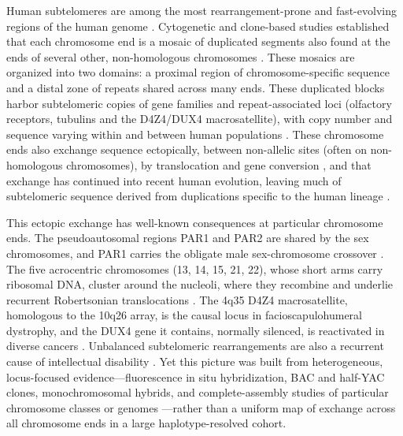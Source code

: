 \documentclass[pdflatex,mathphys]{jnl}
\begin{document}
\maketitle

Human subtelomeres are among the most rearrangement-prone and fast-evolving
regions of the human genome \cite{MeffordTrask2002}. Cytogenetic and clone-based studies established that each chromosome end is a mosaic of duplicated segments also found at the ends of several other, non-homologous chromosomes \cite{Flint1997,Linardopoulou2005}. These mosaics are organized into two domains: a proximal region of chromosome-specific sequence and a distal zone of repeats shared across many ends.
These duplicated blocks harbor subtelomeric copies of gene families and
repeat-associated loci (olfactory receptors, tubulins and the D4Z4/DUX4
macrosatellite), with copy number and sequence varying within and between human
populations
\cite{MeffordTrask2002,segdup_bailey_eichler2006,segdup_jeong_yoo2025}.
These chromosome ends also exchange sequence ectopically, between non-allelic sites (often on non-homologous chromosomes), by translocation and gene conversion \cite{Brown1990,Wilkie1991,Trask1991}, and that exchange has continued into recent human evolution, leaving much of subtelomeric sequence derived from duplications specific to the human lineage \cite{Linardopoulou2005}.

This ectopic exchange has well-known consequences at particular chromosome ends.
The pseudoautosomal regions PAR1 and PAR2 are shared by the sex chromosomes,
and PAR1 carries the obligate male sex-chromosome crossover
\cite{Rouyer1986,sexchrompars_bellott2024}.
The five acrocentric chromosomes (13, 14, 15, 21, 22), whose short arms carry
ribosomal DNA, cluster around the nucleoli, where they recombine and underlie
recurrent Robertsonian translocations
\cite{acrocentric_Altemose2022,Guarracino2023,acrocentric_rdna_robertsonian_deLima2025,acrocentric_Guarracino2025ape}.
The 4q35 D4Z4 macrosatellite, homologous to the 10q26 array, is the causal
locus in facioscapulohumeral dystrophy, and the DUX4 gene it contains, normally
silenced, is reactivated in diverse cancers
\cite{dux4_d4z4_fshd_lemmers2010worldwide,dux4_cancer_Chew2019}.
Unbalanced subtelomeric rearrangements are also a recurrent cause of
intellectual disability
\cite{MeffordTrask2002}.
Yet this picture was built from heterogeneous, locus-focused evidence---fluorescence in situ hybridization, BAC and half-YAC clones, monochromosomal hybrids, and complete-assembly studies of particular chromosome classes or genomes
\cite{Mefford2001,Riethman2004,Ambrosini2007,Guarracino2023,acrocentric_rdna_robertsonian_deLima2025}---rather than a uniform map of exchange across all chromosome ends in a large haplotype-resolved cohort.
\end{document}
